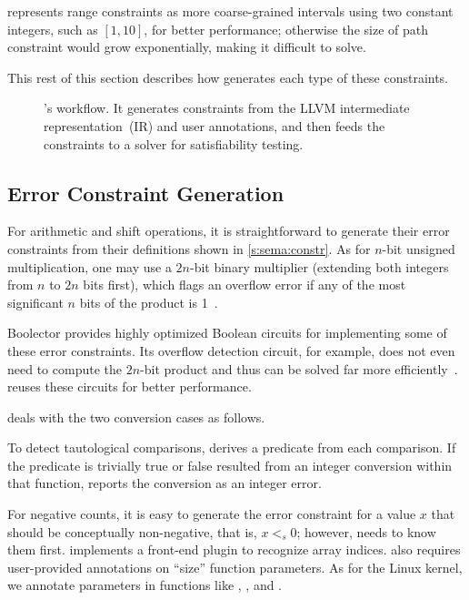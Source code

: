 \sys represents range constraints as more coarse-grained intervals
using two constant integers, such as $[1, 10]$, for better performance;
otherwise the size of path constraint would grow exponentially,
making it difficult to solve.

\paraend

This rest of this section describes how \sys generates each type
of these constraints.

\begin{figure}
\centering
\resizebox{\linewidth}{!}{

}
\caption{\sys's workflow.  It generates constraints from the LLVM
intermediate representation~(IR) and user annotations, and then feeds
the constraints to a solver for satisfiability testing.}
\label{f:flow}
\end{figure}

\subsection{Error Constraint Generation}
\label{s:gen:err}

For arithmetic and shift operations, it is straightforward to
generate their error constraints from their definitions shown in
\autoref{s:sema:constr}.  As for $n$-bit unsigned multiplication,
one may use a $2n$-bit binary multiplier (extending both integers
from $n$ to $2n$ bits first), which flags an overflow error if any
of the most significant $n$ bits of the product is
1~\cite{molnar:catchconv}.

Boolector provides highly optimized Boolean circuits for implementing
some of these error constraints.  Its overflow detection circuit,
for example, does not even need to compute the $2n$-bit product and
thus can be solved far more
efficiently~\cite[\chapterautorefname~3.5]{brummayer:phd}.  \sys
reuses these circuits for better performance.

\sys deals with the two conversion cases as follows.

To detect tautological comparisons, \sys derives a predicate from
each comparison.  If the predicate is trivially true or false
resulted from an integer conversion within that function, \sys
reports the conversion as an integer error.

For negative counts, it is easy to generate the error constraint
for a value $x$ that should be conceptually non-negative, that is,
$x <_s 0$; however, \sys needs to know them first.  \sys implements
a front-end plugin to recognize array indices.  \sys also requires
user-provided annotations on ``size'' function parameters.  As for
the Linux kernel, we annotate parameters in functions like ,
, and .

